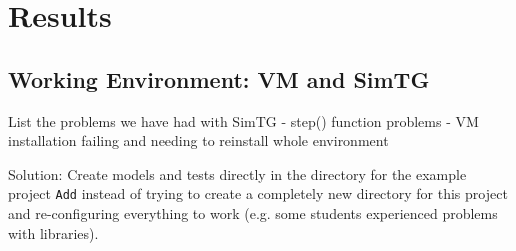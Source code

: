 \section{Results}
\label{sec:results}




\subsection{Working Environment: VM and SimTG}

List the problems we have had with SimTG
- step() function problems
- VM installation failing and needing to reinstall whole environment

Solution: Create models and tests directly in the directory for the example project \texttt{Add} instead of trying to create a completely new directory for this project and re-configuring everything to work (e.g. some students experienced problems with libraries).
